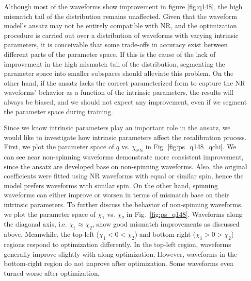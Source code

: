\documentclass[twocolumn]{aastex631}
\begin{document}
Although most of the waveforms show improvement in figure \ref{fig:q148}, the
high mismatch tail of the distribution remains unaffected. Given that the
waveform model's ansatz may not be entirely compatible with NR, and the
optimization procedure is carried out over a distribution of waveforms with
varying intrinsic parameters, it is conceivable that some trade-offs in accuracy
exist between different parts of the parameter space. If this is the cause of
the lack of improvement in the high mismatch tail of the distribution,
segmenting the parameter space into smaller subspaces should alleviate this
problem. On the other hand, if the ansatz lacks the correct parameterized form
to capture the NR waveforms' behavior as a function of the intrinsic parameters,
the results will always be biased, and we should not expect any improvement,
even if we segment the parameter space during training.

Since we know intrinsic parameters play an important role in the ansatz, we
would like to investigate how intrinsic parameters affect the recalibration
process. First, we plot the parameter space of $q$ vs. $\chi_{\mathrm{PN}}$ in
Fig. \ref{fig:ps_q148_qchi}. We can see near non-spinning waveforms demonstrate
more consistent improvement, since the ansatz are developed base on non-spinning 
waveforms. Also, the original coefficients were fitted using NR waveforms with
equal or similar spin, hence the model prefers waveforms with similar spin. On 
the other hand, spinning waveforms can either improve or worsen in terms of 
mismatch base on their intrinsic parameters. To further discuss the behavior of 
non-spinning waveforms, we plot the parameter space of $\chi_1$ vs. $\chi_2$ in
Fig.~\ref{fig:ps_q148}. Waveforms along the diagonal axis, i.e. 
$\chi_1\approx\chi_2$, show good mismatch improvements as discussed above. 
Meanwhile, the top-left ($\chi_1<0<\chi_2$) and bottom-right ($\chi_1>0>\chi_2$) 
regions respond to optimization differently. In the top-left 
region, waveforms generally improve slightly with along optimization. However, waveforms 
in the bottom-right region do not improve after optimization. Some waveforms even 
turned worse after optimization. 
\end{document}
